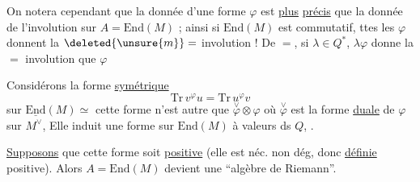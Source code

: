 On notera cependant que la donnée d'une
forme $\varphi$  est \uline{plus} \uline{précis} que la donnée de
l'involution sur $A=\mathrm{End}(M)$ ; ainsi si $\mathrm{End}(M)$
est commutatif, ttes les $\varphi$ donnent la
$\deleted{\unsure{m}}=$ involution ! De $=$, si $\lambda\in Q^*$, $\lambda\varphi$ donne
la $=$ involution que $\varphi$

Considérons la forme \uline{symétrique}
\[
\mathrm{Tr}\,v^\varphi u=\mathrm{Tr}\,u^\varphi v
\]
sur   $\underline{\mathrm{End}}(M)\simeq$  
cette forme n'est autre que $\overset{\vee}{\varphi}\otimes\varphi$ où
$\overset{\vee}{\varphi}$ est la forme \uline{duale} de $\varphi$ sur $M^\vee$,  
Elle induit une forme sur
$\mathrm{End}(M)$ à valeurs ds $Q$, .

\uline{Supposons} que cette forme soit 
\uline{positive} (elle est néc. non dég, donc \uline{définie}
positive).  Alors
$A=\mathrm{End}(M)$ devient une ``algèbre de Riemann''.
